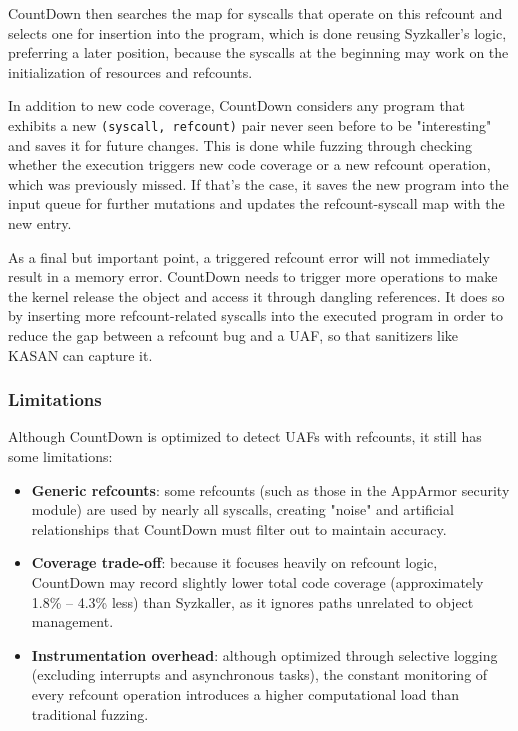 \begin{enumerate}
    CountDown then searches the map for syscalls that operate on this refcount and selects one for insertion into the program, which is done reusing Syzkaller's logic, preferring a later position, because the syscalls at the beginning may work on the initialization of resources and refcounts.

    In addition to new code coverage, CountDown considers any program that exhibits a new \texttt{(syscall, refcount)} pair never seen before to be "interesting" and saves it for future changes. This is done while fuzzing through checking whether the execution triggers new code coverage or a new refcount operation, which was previously missed. If that's the case, it saves the new program into the input queue for further mutations and updates the refcount-syscall map with the new entry.

    As a final but important point, a triggered refcount error will not immediately result in a memory error. CountDown needs to trigger more operations to make the kernel release the object and access it through dangling references. It does so by inserting more refcount-related syscalls into the executed program in order to reduce the gap between a refcount bug and a UAF, so that sanitizers like KASAN can capture it.
\end{enumerate}

\subsubsection{Limitations}
Although CountDown is optimized to detect UAFs with refcounts, it still has some limitations:
\begin{itemize}
    \item \textbf{Generic refcounts}: some refcounts (such as those in the AppArmor security module) are used by nearly all syscalls, creating "noise" and artificial relationships that CountDown must filter out to maintain accuracy.

    \item \textbf{Coverage trade-off}: because it focuses heavily on refcount logic, CountDown may record slightly lower total code coverage (approximately 1.8\% – 4.3\% less) than Syzkaller, as it ignores paths unrelated to object management.

    \item \textbf{Instrumentation overhead}: although optimized through selective logging (excluding interrupts and asynchronous tasks), the constant monitoring of every refcount operation introduces a higher computational load than traditional fuzzing.
\end{itemize}

